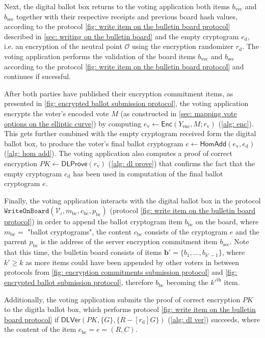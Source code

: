 Next, the digital ballot box returns to the voting application both items $b_\mathrm{vec}$ and $b_\mathrm{sec}$ together with their respective receipts and previous board hash values, according to the protocol \ref{fig: write item on the bulletin board protocol} described in \cref{sec: writing on the bulletin board} and the empty cryptogram $e_\mathrm{d}$, i.e. an encryption of the neutral point $\mathcal{O}$ using the encryption randomizer $r_\mathrm{d}$. The voting application performs the validation of the board items $b_\mathrm{vec}$ and $b_\mathrm{sec}$ according to the protocol \ref{fig: write item on the bulletin board protocol} and continues if sucessful.

After both parties have published their encryption commitment items, as presented in \cref{fig: encrypted ballot submission protocol}, the voting application encrypts the voter's encoded vote $M$ (as constructed in \cref{sec: mapping vote options on the elliptic curve}) by computing $e_\mathrm{v} \gets \mathsf{Enc}(Y_\mathrm{enc}, M; r_\mathrm{v})$ (\cref{alg: enc}). This gets further combined with the empty cryptogram received form the digital ballot box, to produce the voter's final ballot cryptogram $e \gets \mathsf{HomAdd}(e_\mathrm{v}, e_\mathrm{d})$ (\cref{alg: hom add}). The voting application also computes a proof of correct encryption $PK \gets \mathsf{DLProve}(r_\mathrm{v})$ (\cref{alg: dl prove}) that confirms the fact that the empty cryptogram $e_\mathrm{d}$ has been used in computation of the final ballot cryptogram $e$.

Finally, the voting application interacts with the digital ballot box in the protocol $\mathtt{WriteOnBoard}(\mathcal{V}_i, m_\mathrm{bc}, c_\mathrm{bc}, p_\mathrm{bc})$ (protocol \ref{fig: write item on the bulletin board protocol}) in order to append the ballot cryptogram item $b_\mathrm{bc}$ on the board, where $m_\mathrm{bc} =$ "ballot cryptograms", the content $c_\mathrm{bc}$ consists of the cryptogram $e$ and the parrent $p_\mathrm{bc}$ is the address of the server encryption commitment item $b_\mathrm{sec}$. Note that this time, the bulletin board consists of items $\boldsymbol{b'} = \{ b_1, ..., b_{k'-1} \}$, where $k' \geq k$ as more items could have been appended by other voters in between protocols from \cref{fig: encryption commitments submission protocol} and \cref{fig: encrypted ballot submission protocol}, therefore $b_\mathrm{bc}$ becoming the ${k'}^\mathrm{th}$ item.

Additionally, the voting application submits the proof of correct encryption $PK$ to the digitla ballot box, which performs protocol \ref{fig: write item on the bulletin board protocol} if $\mathsf{DLVer}(PK, \{ G \}, \{ R - [r_\mathrm{d}]G \})$ (\cref{alg: dl ver}) succeeds, where the content of the item $c_\mathrm{bc} = e = (R, C)$.

